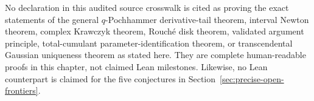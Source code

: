 No declaration in this audited source crosswalk is cited as proving the exact
statements of the general
\(q\)-Pochhammer derivative-tail theorem, interval Newton theorem, complex
Krawczyk theorem, Rouch\'e disk theorem, validated argument principle,
total-cumulant parameter-identification theorem, or transcendental Gaussian
uniqueness theorem as stated here.  They are complete human-readable proofs
in this chapter, not claimed Lean milestones.  Likewise, no Lean counterpart
is claimed for the five conjectures in
Section~\ref{sec:precise-open-frontiers}.
